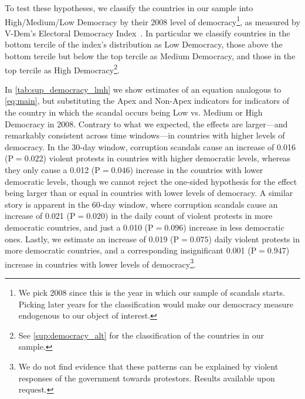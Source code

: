 \documentclass[11pt]{article}
\begin{document}
To test these hypotheses, we classify the countries in our sample into High/Medium/Low Democracy by their 2008 level of democracy\footnote{We pick 2008 since this is the year in which our sample of scandals starts. Picking later years for the classification would make our democracy measure endogenous to our object of interest.}, as measured by V-Dem's Electoral Democracy Index~\citep{vdem2024}. In particular we classify countries in the bottom tercile of the index's distribution as Low Democracy, those above the bottom tercile but below the top tercile as Medium Democracy, and those in the top tercile as High Democracy\footnote{See \autoref{sup:democracy_alt} for the classification of the countries in our sample.}.

In \autoref{tab:sup_democracy_lmh} we show estimates of an equation analogous to \autoref{eq:main}, but substituting the Apex and Non-Apex indicators for indicators of the country in which the scandal occurs being Low vs. Medium or High Democracy in 2008. Contrary to what we expected, the effects are larger---and remarkably consistent across time windows---in countries with higher levels of democracy. In the 30-day window, corruption scandals cause an increase of 0.016 (P$=0.022$) violent protests in countries with higher democratic levels, whereas they only cause a 0.012 (P$=0.046$) increase in the countries with lower democratic levels, though we cannot reject the one-sided hypothesis for the effect being larger than or equal in countries with lower levels of democracy. A similar story is apparent in the 60-day window, where corruption scandals cause an increase of 0.021 (P$=0.020$) in the daily count of violent protests in more democratic countries, and just a 0.010 (P$=0.096$) increase in less democratic ones. Lastly, we estimate an increase of 0.019 (P$=0.075$) daily violent protests in more democratic countries, and a corresponding insignificant 0.001 (P$=0.947$) increase in countries with lower levels of democracy\footnote{We do not find evidence that these patterns can be explained by violent responses of the government towards protestors. Results available upon request.}.
\end{document}
